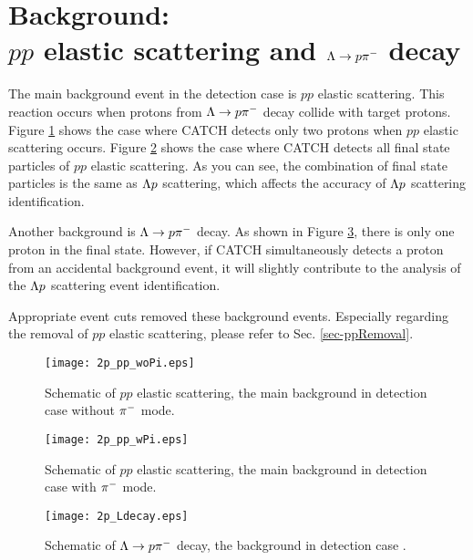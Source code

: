 \section{Background:\\ $pp$ elastic scattering and $\Lambda\to p\pi^{-}$ decay}
The main background event in the detection case  is $pp$ elastic scattering. This reaction occurs when protons from $\Lambda\to p\pi^{-}$ decay collide with target protons. Figure \ref{fig-2p_pp_woPi} shows the case where CATCH detects only two protons when $pp$ elastic scattering occurs. Figure \ref{fig-2p_pp_wPi} shows the case where CATCH detects all final state particles of $pp$ elastic scattering. As you can see, the combination of final state particles is the same as $\Lambda p$ scattering, which affects the accuracy of $\Lambda p$ scattering identification.

Another background is $\Lambda\to p\pi^{-}$ decay. As shown in Figure \ref{fig-2p_Ldecay}, there is only one proton in the final state. However, if CATCH simultaneously detects a proton from an accidental background event, it will slightly contribute to the analysis of the $\Lambda p$ scattering event identification.

Appropriate event cuts removed these background events. Especially regarding the removal of $pp$ elastic scattering, please refer to Sec. \ref{sec-ppRemoval}.

\begin{figure}[!h]
  \begin{center}
    \texttt{[image: 2p\_pp\_woPi.eps]}
    \caption{Schematic of $pp$ elastic scattering, the main background in detection case  without $\pi^{-}$ mode.}
    \label{fig-2p_pp_woPi}
  \end{center}
\end{figure}

\begin{figure}[!h]
  \begin{center}
    \texttt{[image: 2p\_pp\_wPi.eps]}
    \caption{Schematic of $pp$ elastic scattering, the main background in detection case  with $\pi^{-}$ mode. }
    \label{fig-2p_pp_wPi} 
  \end{center}
\end{figure}

\begin{figure}[!h]
  \begin{center}
    \texttt{[image: 2p\_Ldecay.eps]}
    \caption{Schematic of $\Lambda\to p\pi^{-}$ decay, the background in detection case . }
    \label{fig-2p_Ldecay}
  \end{center}
\end{figure}


